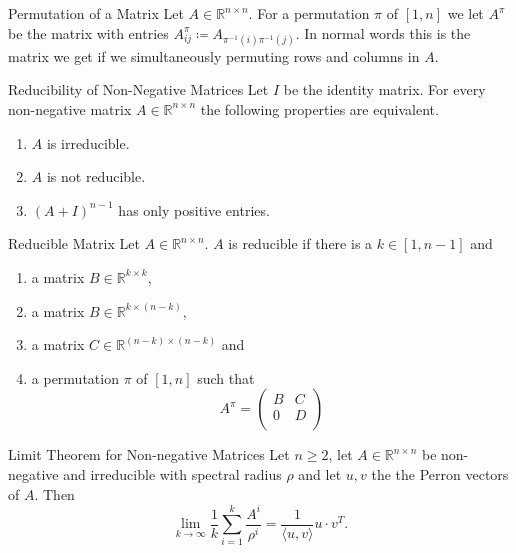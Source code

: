 \documentclass{panikzettel}
\begin{document}
\begin{halfboxl}
\vspace{-\baselineskip}
	\begin{defi}{Permutation of a Matrix}
	Let $A\in\mathbb{R}^{n\times n}$. For a permutation $\pi$ of $[1,n]$ we let $A^\pi$ be the matrix with entries $A_{ij}^\pi\coloneqq A_{\pi^{-1}(i)\pi^{-1}(j)}$. In normal words this is the matrix we get if we simultaneously permuting rows and columns in $A$.
	\end{defi}
	\begin{theo}{Reducibility of Non-Negative Matrices}
	Let $I$ be the identity matrix. For every non-negative matrix $A\in\mathbb{R}^{n\times n}$ the following properties are equivalent.
	\begin{enumerate}
	\item $A$ is irreducible.
	\item $A$ is not reducible.
	\item $(A+I)^{n-1}$ has only positive entries.
	\end{enumerate}
	\end{theo}
\end{halfboxl}
\begin{halfboxr}
\vspace{-\baselineskip}
	\begin{defi}{Reducible Matrix}
	Let $A\in\mathbb{R}^{n\times n}$. $A$ is reducible if there is a $k\in[1,n-1]$ and
	\begin{enumerate}
	\item a matrix $B\in\mathbb{R}^{k\times k}$,
	\item a matrix $B\in\mathbb{R}^{k\times (n-k)}$,
	\item a matrix $C\in\mathbb{R}^{(n-k)\times (n-k)}$ and
	\item a permutation $\pi$ of $[1,n]$ such that
	\[
	A^\pi=
	\begin{pmatrix}
	B & C\\
	0 & D\\
	\end{pmatrix}
	\]
	\end{enumerate}
	\end{defi}
	\begin{theo}{Limit Theorem for Non-negative Matrices}
	Let $n\geq 2$, let $A\in\mathbb{R}^{n\times n}$ be non-negative and irreducible with spectral radius $\rho$ and let $u,v$ the the Perron vectors of $A$. Then
	\[
	\lim_{k\to\infty}\frac{1}{k}\sum_{i=1}^k \frac{A^i}{\rho^i}=\frac{1}{\langle u,v \rangle} u\cdot v^T.
	\]
	\end{theo}
\end{halfboxr}
\end{document}

